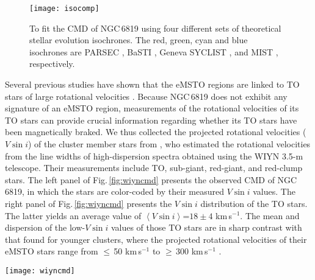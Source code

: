 \documentclass[twocolumn]{aastex631}
\begin{document}
\begin{figure}
	\centering
	\texttt{[image: isocomp]}
	\caption{To fit the CMD of NGC\,6819 using four different sets of theoretical stellar evolution isochrones. The red, green, cyan and blue isochrones are PARSEC \citep{2012MNRAS.427..127B, Marigo2017A}, BaSTI  \citep{2004ApJ...612..168P}, Geneva SYCLIST \citep{2014A&A...566A..21G}, and MIST \citep{2016ApJ...823..102C}, respectively.}
	\label{fig:isocomp}
\end{figure}

Several previous studies have shown that the eMSTO regions are linked to TO stars of large rotational velocities \citep{bastian2018extended,2018ApJ...863L..33M,marino2018different, sun2019stellar}. Because NGC\,6819 does not exhibit any signature of an eMSTO region, measurements of the rotational velocities of its TO stars can provide crucial information regarding whether its TO stars have been magnetically braked. We thus collected the projected rotational velocities ($V\sin{i}$) of the cluster member stars from \citet{leebrown2015spectroscopic}, who estimated the rotational velocities from the line widths of high-dispersion spectra obtained using the WIYN 3.5-m telescope. Their measurements include TO, sub-giant, red-giant, and red-clump stars. The left panel of Fig.\,\ref{fig:wiyncmd} presents the observed CMD of NGC\,6819, in which the stars are color-coded by their measured $V\sin{i}$ values. The right panel of Fig.\,\ref{fig:wiyncmd} presents the $V\sin{i}$ distribution of the TO stars. The latter yields an average value of $\left<{V\sin{i}}\right>$=$18\pm4$ km$\,$s$^{-1}$. The mean and dispersion of the low-$V\sin{i}$ values of those TO stars are in sharp contrast with that found for younger clusters, where the projected rotational velocities of their eMSTO stars range from $\le\,$50 km$\,$s$^{-1}$ to $\ge\,$300 km$\,$s$^{-1}$ \citep{marino2018different,sun2019stellar}. 
\begin{figure*}
	\centering
	\texttt{[image: wiyncmd]}
	\caption{Left: the observed CMD of NGC 6819 with the projected rotational velocities of some stars are color-coded. Right: distribution of projected rotational velocities of TO stars (selected from the red parallelogram in the CMD, as shown in the left panel).}
	\label{fig:wiyncmd}
\end{figure*}
\end{document}
